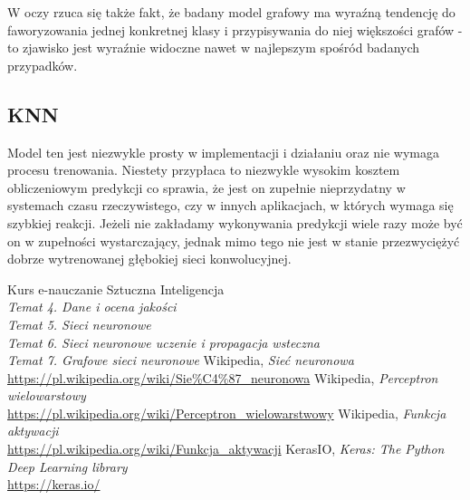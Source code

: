 \documentclass{article}
\begin{document}
W oczy rzuca się także fakt, że badany model grafowy ma
wyraźną tendencję do faworyzowania jednej konkretnej klasy
i przypisywania do niej większości grafów - to zjawisko jest
wyraźnie widoczne nawet w najlepszym spośród badanych przypadków.

\subsection*{KNN}
Model ten jest niezwykle prosty w implementacji i 
działaniu oraz nie wymaga procesu trenowania. Niestety 
przypłaca to niezwykle wysokim kosztem obliczeniowym predykcji 
co sprawia, że jest on zupełnie nieprzydatny w systemach czasu 
rzeczywistego, czy w innych aplikacjach, w których wymaga się 
szybkiej reakcji. Jeżeli nie zakładamy wykonywania predykcji wiele 
razy może być on w zupełności wystarczający, jednak mimo tego nie jest 
w stanie przezwyciężyć dobrze wytrenowanej głębokiej sieci konwolucyjnej.



\renewcommand{\refname}{Źródła}
\begin{thebibliography}{100}
     Kurs e-nauczanie Sztuczna Inteligencja\\
    \textit{Temat 4. Dane i ocena jakości}\\
    \textit{Temat 5. Sieci neuronowe}\\
    \textit{Temat 6. Sieci neuronowe uczenie i propagacja wsteczna}\\
    \textit{Temat 7. Grafowe sieci neuronowe}
     Wikipedia,
    \textit{Sieć neuronowa}
    \\\url{https://pl.wikipedia.org/wiki/Sie%C4%87_neuronowa}
     Wikipedia,
    \textit{Perceptron wielowarstowy}
    \\\url{https://pl.wikipedia.org/wiki/Perceptron_wielowarstwowy}
     Wikipedia,
    \textit{Funkcja aktywacji}
    \\\url{https://pl.wikipedia.org/wiki/Funkcja_aktywacji}
     KerasIO,
    \textit{Keras: The Python Deep Learning library}
    \\\url{https://keras.io/}
\end{thebibliography}
\end{document}
